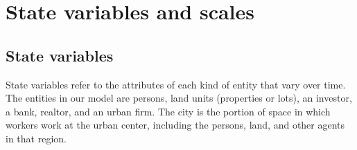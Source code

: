 


\section{State variables and scales}
\subsection{State variables}
State variables refer to the attributes of each kind of entity that vary over time. %
The entities in our model are persons, land units (properties or lots), an investor, a bank,  realtor, and an urban firm. 
The city is the portion of space in which workers work at the urban center, including the persons, land, and other agents in that region. %



